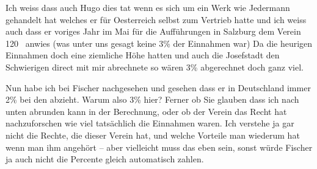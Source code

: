 \pstart
           Ich weiss dass auch Hugo dies tat wenn es sich
               um ein Werk wie Jedermann gehandelt hat welches
               er für Oesterreich selbst zum Vertrieb hatte
               und ich weiss auch dass er voriges Jahr im Mai für die Aufführungen in
                  Salzburg dem Verein 120 \label{K_L02525-1v}\label{K_L02525-1} anwies (was unter uns gesagt keine 3{\%} der Einnahmen war) Da die heurigen Einnahmen doch eine
               ziemliche Höhe hatten und auch die Josefstadt den
                  Schwierigen direct mit mir abrechnete so
               wären 3{\%}{ } abgerechnet doch ganz viel.\pend
           
\pstart
           Nun habe ich bei Fischer nachgesehen und gesehen
               dass er in Deutschland immer 2{\%} bei den \label{T_L02525-1v}\label{T_L02525-1} abzieht. Warum also 3{\%} hier? Ferner ob Sie glauben dass ich nach unten abrunden
               kann in der Berechnung, oder ob der Verein das Recht hat nachzuforschen wie viel tatsächlich die Einnahmen
               waren. Ich verstehe ja gar nicht die Rechte, die dieser Verein hat, und welche Vorteile man
               wiederum hat wenn man ihm angehört – aber vielleicht muss das eben sein, sonst würde
               Fischer ja auch nicht die Percente gleich automatisch zahlen.\pend
           
